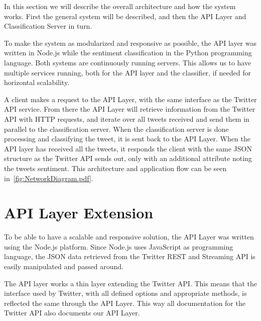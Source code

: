 In this section we will describe the overall architecture and how the system works. First the general system will be described, and then the API Layer and Classification Server in turn.  

To make the system as modularized and responsive as possible, the API layer was written in Node.js while the sentiment classification in the Python programming language. Both systems are continuously running servers. This allows us to have multiple services running, both for the API layer and the classifier, if needed for horizontal scalability. 


A client makes a request to the API Layer, with the same interface as the Twitter API service. From there the API Layer will retrieve information from the Twitter API with HTTP requests, and iterate over all tweets received and send them in parallel to the classification server. When the classification server is done processing and classifying the tweet, it is sent back to the API Layer. When the API layer has received all the tweets, it responds the client with the same JSON structure as the Twitter API sends out, only with an additional attribute noting the tweets sentiment. This architecture and application flow can be seen in~\autoref{fig:NetworkDiagram.pdf}. 

\section{API Layer Extension}



To be able to have a scalable and responsive solution, the API Layer was written using the Node.js platform. Since Node.js uses JavaScript as programming language, the JSON data retrieved from the Twitter REST and Streaming API is easily manipulated and passed around. 

The API layer works a thin layer extending the Twitter API. This means that the interface used by Twitter, with all defined options and appropriate methods, is reflected the same through the API Layer. This way all documentation for the Twitter API also documents our API Layer. 

